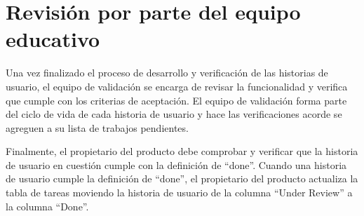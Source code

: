 \section{Revisión por parte del equipo educativo}
Una vez finalizado el proceso de desarrollo y verificación de las historias de usuario, el equipo de validación se encarga de revisar la funcionalidad y verifica que cumple con los criterias de aceptación. El equipo de validación forma parte del ciclo de vida de cada historia de usuario y hace las verificaciones acorde se agreguen a su lista de trabajos pendientes.

Finalmente, el propietario del producto debe comprobar y verificar que la historia de usuario en cuestión cumple con la definición de \enquote{done}. Cuando una historia de usuario cumple la definición de \enquote{done}, el propietario del producto actualiza la tabla de tareas moviendo la historia de usuario de la columna \enquote{Under Review} a la columna \enquote{Done}.